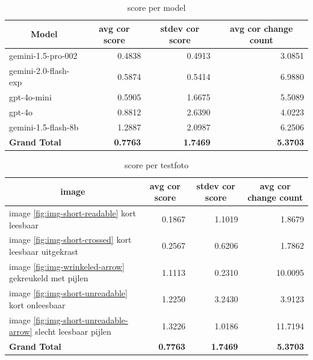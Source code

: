 \documentclass[12pt]{article}
\begin{document}
\noindent\begin{table}[H]
\caption{score per model}
\label{fig:score-model}
\begin{tabularx}{\textwidth}{X *3{r}}
    \toprule
    \multicolumn{1}{c}{\textbf{Model}} & \multicolumn{1}{c}{\textbf{avg cor score}} & \multicolumn{1}{c}{\textbf{stdev cor score}} & \multicolumn{1}{c}{\textbf{avg cor change count}} \\
    \midrule
    gemini-1.5-pro-002 & 0.4838 & 0.4913 & 3.0851 \\
    gemini-2.0-flash-exp & 0.5874 & 0.5414 & 6.9880 \\
    gpt-4o-mini & 0.5905 & 1.6675 & 5.5089 \\
    gpt-4o & 0.8812 & 2.6390 & 4.0223 \\
    gemini-1.5-flash-8b & 1.2887 & 2.0987 & 6.2506 \\
    \midrule
    \textbf{Grand Total} & \textbf{0.7763} & \textbf{1.7469} & \textbf{5.3703} \\
    \bottomrule
\end{tabularx}%
\end{table}



\noindent\begin{table}[H]
\caption{score per testfoto}
\label{fig:score-image}
\begin{tabularx}{\textwidth}{X *3{r}}
    \toprule
    \multicolumn{1}{c}{\textbf{image}} & \multicolumn{1}{c}{\textbf{avg cor score}} & \multicolumn{1}{c}{\textbf{stdev cor score}} & \multicolumn{1}{c}{\textbf{avg cor change count}} \\
    \midrule
    image \ref{fig:img-short-readable} kort leesbaar & 0.1867 & 1.1019 & 1.8679 \\
    image \ref{fig:img-short-crossed} kort leesbaar uitgekrast & 0.2567 & 0.6206 & 1.7862 \\
    image \ref{fig:img-wrinkeled-arrow} gekreukeld met pijlen & 1.1113 & 0.2310 & 10.0095 \\
    image \ref{fig:img-short-unreadable} kort onleesbaar & 1.2250 & 3.2430 & 3.9123 \\
    image \ref{fig:img-short-unreadable-arrow} slecht leesbaar pijlen & 1.3226 & 1.0186 & 11.7194 \\
    \midrule
    \textbf{Grand Total} & \textbf{0.7763} & \textbf{1.7469} & \textbf{5.3703} \\
    \bottomrule
\end{tabularx}%
\end{table}
\end{document}
